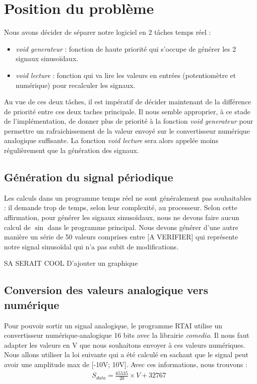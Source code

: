 \section{Position du problème}
Nous avons décider de séparer notre logiciel en 2 tâches temps réel : \begin{itemize}
\item \emph{void generateur} : fonction de haute priorité qui s'occupe de générer les 2 signaux sinusoïdaux. 
\item \emph{void lecture} : fonction qui va lire les valeurs en entrées (potentiomètre et numérique) pour recalculer les signaux.
\end{itemize}
Au vue de ces deux tâches, il est impératif de décider maintenant de la différence de priorité entre ces deux taches principale. Il nous semble approprier, à ce stade de l'implémentation, de donner plus de priorité à la fonction \emph{void generateur} pour permettre un rafraichissement de la valeur envoyé sur le convertisseur numérique analogique suffisante. La fonction \emph{void lecture} sera alors appelée moins régulièrement que la génération des signaux.
\subsection{Génération du signal périodique}
\label{subsection:signalperiodique}
Les calculs dans un programme temps réel ne sont généralement pas souhaitables : il demande trop de temps, selon leur complexité, au processeur. Selon cette affirmation, pour générer les signaux sinusoïdaux, nous ne devons faire aucun calcul de $\sin$ dans le programme principal. Nous devons générer d'une autre manière un série de 50 valeurs comprises entre [A VERIFIER] qui représente notre signal sinusoïdal qui n'a pas subit de modifications.

SA SERAIT COOL D'ajouter un graphique
\subsection{Conversion des valeurs analogique vers numérique}
Pour pouvoir sortir un signal analogique, le programme RTAI utilise un convertisseur numérique-analogique 16 bits avec la librairie \emph{comedio}. Il nous faut adapter les valeurs en V que nous souhaitons envoyer à ces valeurs numériques. Nous allons utiliser la loi suivante qui a été calculé en sachant que le signal peut avoir une amplitude max de [-10V; 10V]. Avec ces informations, nous trouvons : \begin{align*}
S_{data} = \frac{65535}{20}\times V + 32767
\end{align*}

